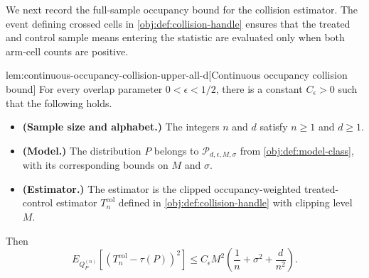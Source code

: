 \documentclass[11pt]{article}
\begin{document}
We next record the full-sample occupancy bound for the collision estimator. The event defining crossed cells in \cref{obj:def:collision-handle} ensures that the treated and control sample means entering the statistic are evaluated only when both arm-cell counts are positive.

\begin{lemmav}{lem:continuous-occupancy-collision-upper-all-d}[Continuous occupancy collision bound]
For every overlap parameter \(0<\epsilon<1/2\), there is a constant \(C_{\epsilon}>0\) such that the following holds.
\begin{itemize}
\item \textbf{(Sample size and alphabet.)} The integers \(n\) and \(d\) satisfy \(n\ge 1\) and \(d\ge 1\).
\item \textbf{(Model.)} The distribution \(P\) belongs to \(\mathcal P_{d,\epsilon,M,\sigma}\) from \cref{obj:def:model-class}, with its corresponding bounds on \(M\) and \(\sigma\).
\item \textbf{(Estimator.)} The estimator is the clipped occupancy-weighted treated-control estimator \(T_n^{\mathrm{col}}\) defined in \cref{obj:def:collision-handle} with clipping level \(M\).
\end{itemize}
Then
\[
  E_{Q_P^{(n)}}\!\left[\left(T_n^{\mathrm{col}}-\tau(P)\right)^2\right]
  \le
  C_{\epsilon}M^2
  \left(
    \frac{1}{n}
    +\sigma^2
    +\frac{d}{n^2}
  \right).
\]
\end{lemmav}
\end{document}
